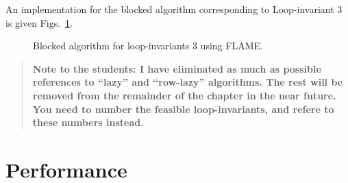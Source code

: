 An implementation for the blocked algorithm corresponding to
Loop-invariant 3 is given Figs.~\ref{fig:syrk_un_right}.

\begin{figure}[htbp]
\begin{quote}
%
\end{quote}
\caption{Blocked algorithm for loop-invariants 3 using FLAME.}
\label{fig:syrk_un_right}
\end{figure}

\begin{quote}
\bf Note to the students: I have eliminated as much
as possible references to ``lazy'' and ``row-lazy'' algorithms.  The
rest will be removed from the remainder of the chapter in the near
future.  You need to number the feasible loop-invariants, and refere
to these numbers instead.
\end{quote}

\section{Performance}


